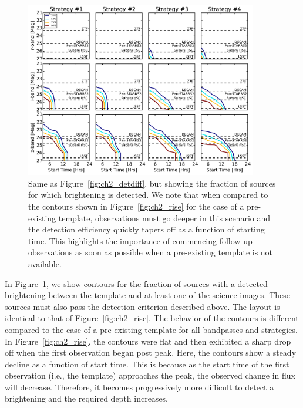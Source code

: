\begin{figure}[t!]
\centering
\includegraphics[width=0.9\textwidth]{./figs/chapter2/ch2_f13.pdf}
\caption{Same as Figure~\ref{fig:ch2_detdiff}, but showing the fraction of sources for which brightening is detected. We note that when compared to the contours shown in Figure~\ref{fig:ch2_rise} for the case of a pre-existing template, observations must go deeper in this scenario and the detection efficiency quickly tapers off as a function of starting time. This highlights the importance of commencing follow-up observations as soon as possible when a pre-existing template is not available.}
\label{fig:ch2_risediff}
\end{figure}

In Figure~\ref{fig:ch2_risediff}, we show contours for the fraction of sources with a detected brightening between the template and at least one of the science images. These sources must also pass the detection criterion described above. The layout is identical to that of Figure~\ref{fig:ch2_rise}. The behavior of the contours is different compared to the case of a pre-existing template for all bandpasses and strategies. In Figure~\ref{fig:ch2_rise}, the contours were flat and then exhibited a sharp drop off when the first observation began post peak. Here, the contours show a steady decline as a function of start time. This is because as the start time of the first observation (i.e., the template) approaches the peak, the observed change in flux will decrease. Therefore, it becomes progressively more difficult to detect a brightening and the required depth increases.


